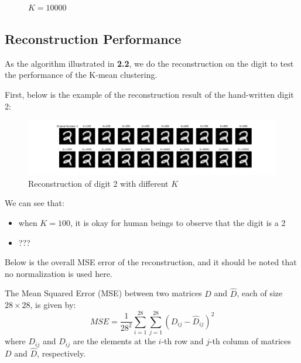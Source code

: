 \documentclass{article}
\begin{document}
\begin{itemize}
\begin{figure}[htbp!]
\begin{minipage}{0.4\textwidth}
        \caption{$K = 10000$}
        \label{fig:10000-centroids}
    \end{minipage}
\end{figure}
    
\end{itemize}
\clearpage

\subsection{Reconstruction Performance}

As the algorithm illustrated in \textbf{2.2}, we do the reconstruction on the digit to test the performance of the K-mean clustering.

First, below is the example of the reconstruction result of the hand-written digit 2:

\begin{figure}[htbp!]
    \centering
    \includegraphics[width = \textwidth]{K-means/Result/Digits/reconstruct-digit.png}
    \caption{Reconstruction of digit 2 with different $K$}
    \label{fig:enter-label}
\end{figure}

We can see that:

\begin{itemize}
    \item when $K = 100$, it is okay for human beings to observe that the digit is a 2
    \item ???
\end{itemize}


Below is the overall MSE error of the reconstruction, and it should be noted that no normalization is used here. 

The Mean Squared Error (MSE) between two matrices \( D \) and \( \hat{D} \), each of size \( 28 \times 28 \), is given by:
\[
MSE = \frac{1}{28^2} \sum_{i=1}^{28} \sum_{j=1}^{28} (D_{ij} - \hat{D}_{ij})^2
\]
where \( D_{ij} \) and \( \hat{D}_{ij} \) are the elements at the \( i \)-th row and \( j \)-th column of matrices \( D \) and \( \hat{D} \), respectively.
\end{document}
